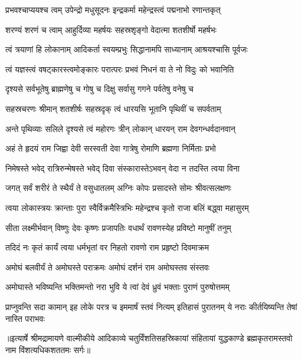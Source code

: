 \twolineshloka
{प्रभवश्चाप्ययश्च त्वम् उपेन्द्रो मधुसूदनः}
{इन्द्रकर्मा महेन्द्रस्त्वं पद्मनाभो रणान्तकृत्}%


\twolineshloka
{शरण्यं शरणं च त्वाम् आहुर्दिव्या महर्षयः}
{सहस्रशृङ्गो वेदात्मा शतशीर्षो महर्षभः}%


\twolineshloka
{त्वं त्रयाणां हि लोकानाम् आदिकर्ता स्वयम्प्रभुः}
{सिद्धानामपि साध्यानाम् आश्रयश्चासि पूर्वजः}%


\twolineshloka
{त्वं यज्ञस्त्वं वषट्कारस्त्वमोङ्कारः परात्परः}
{प्रभवं निधनं वा ते नो विदुः को भवानिति}%


\twolineshloka
{दृश्यसे सर्वभूतेषु ब्राह्मणेषु च गोषु च}
{दिक्षु सर्वासु गगने पर्वतेषु वनेषु च}%


\twolineshloka
{सहस्रचरणः श्रीमान् शतशीर्षः सहस्रदृक्}
{त्वं धारयसि भूतानि पृथिवीं च सपर्वताम्}%


\twolineshloka
{अन्ते पृथिव्याः सलिले दृश्यसे त्वं महोरगः}
{त्रीन् लोकान् धारयन् राम देवगन्धर्वदानवान्}%


\twolineshloka
{अहं ते हृदयं राम जिह्वा देवी सरस्वती}
{देवा गात्रेषु रोमाणि ब्रह्मणा निर्मिताः प्रभो}%


\twolineshloka
{निमेषस्ते भवेद् रात्रिरुन्मेषस्ते भवेद् दिवा}
{संस्कारास्तेऽभवन् वेदा न तदस्ति त्वया विना}%


\twolineshloka
{जगत् सर्वं शरीरं ते स्थैर्यं ते वसुधातलम्}
{अग्निः कोपः प्रसादस्ते सोमः श्रीवत्सलक्षणः}%


\twolineshloka
{त्वया लोकास्त्रयः क्रान्ताः पुरा स्वैर्विक्रमैस्त्रिभिः}
{महेन्द्रश्च कृतो राजा बलिं बद्ध्वा महासुरम्}%


\twolineshloka
{सीता लक्ष्मीर्भवान् विष्णुः देवः कृष्णः प्रजापतिः}
{वधार्थं रावणस्येह प्रविष्टो मानुषीं तनुम्}%


\twolineshloka
{तदिदं नः कृतं कार्यं त्वया धर्मभृतां वर}
{निहतो रावणो राम प्रहृष्टो दिवमाक्रम}%


\twolineshloka
{अमोघं बलवीर्यं ते अमोघस्ते पराक्रमः}
{अमोघं दर्शनं राम अमोघस्तव संस्तवः}%


\twolineshloka
{अमोघास्ते भविष्यन्ति भक्तिमन्तो नरा भुवि}
{ये त्वां देवं ध्रुवं भक्ताः पुराणं पुरुषोत्तमम्}%


\threelineshloka
{प्राप्नुवन्ति सदा कामान् इह लोके परत्र च}
{इममार्षं स्तवं नित्यम् इतिहासं पुरातनम्}
{ये नराः कीर्तयिष्यन्ति तेषां नास्ति पराभवः} %

॥इत्यार्षे श्रीमद्रामायणे वाल्मीकीये आदिकाव्ये चतुर्विंशतिसहस्रिकायां संहितायां युद्धकाण्डे ब्रह्मकृतरामस्तवो नाम विंशत्यधिकशततमः सर्गः॥
